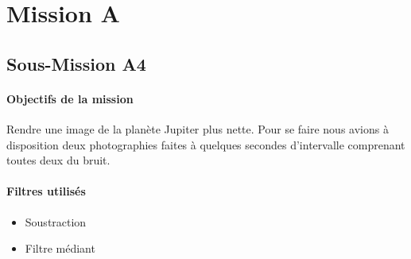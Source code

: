\documentclass{article}
\begin{document}
\section{Mission A}

\subsection{Sous-Mission A4}

\begin{vwcol}[widths={0.8,0.2}, rule=0pt]
\begin{minipage}{0.7\textwidth}
\paragraph{Objectifs de la mission}

Rendre une image de la planète Jupiter plus nette. Pour se faire nous avions à disposition deux photographies faites à quelques secondes d'intervalle comprenant toutes deux du bruit.
\end{minipage}
\begin{minipage}{0.2\textwidth}
\paragraph{Filtres utilisés}

\begin{itemize}
\item Soustraction
\item Filtre médiant
\end{itemize}
\end{minipage}
\end{vwcol} 
\end{document}
